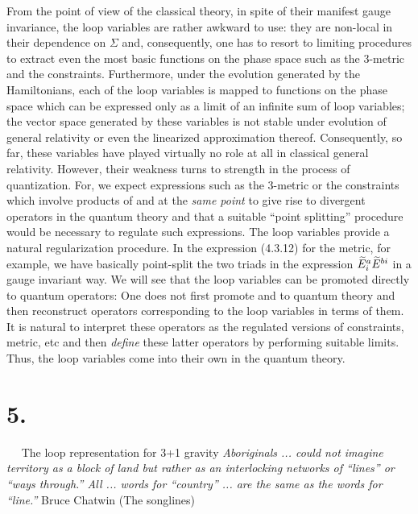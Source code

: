 {}From the point of view of the classical theory, in spite of their manifest
gauge invariance, the loop variables are rather awkward to use: they
are non-local in their dependence on $\Sigma$ and, consequently, one has
to resort to limiting procedures to extract even the most basic functions
on the phase space such as the 3-metric and the constraints. Furthermore,
under the evolution generated by the Hamiltonians, each of the loop
variables is mapped to functions on the phase space which can be
expressed only as a limit of an infinite sum of loop variables; the
vector space generated by these variables is not stable under evolution
of general relativity or even the linearized approximation thereof.
Consequently, so far, these variables have played virtually no role at all
in classical general relativity. However, their weakness turns to strength
in the process of quantization. For, we expect expressions such as the
3-metric or the constraints which involve products of \A\- and \E\- at the
{\it same point} to give rise to divergent operators in the quantum theory
and that a suitable ``point splitting'' procedure would be necessary to
regulate such expressions. The loop variables provide a natural
regularization procedure. In the expression (4.3.12) for the metric, for
example, we have basically point-split the two triads in the expression
$\widetilde{E}^a_i\widetilde{E}^{bi}$ in a gauge invariant way. We will see that the
loop variables can be promoted directly to quantum operators: One
does not first promote \A\- and \E\- to quantum theory and then reconstruct
operators corresponding to the loop variables in terms of them. It is
natural to interpret these operators as the regulated versions of
constraints, metric, etc and then {\it define} these latter operators
by performing suitable limits. Thus, the loop variables come into their
own in the quantum theory.

\goodbreak
\vfill\break

%
\section{5.}{${}\quad $ The loop representation for 3+1 gravity}%
\medskip
{\narrower\narrower\smallskip\noindent
{\sl Aboriginals ... could not imagine territory as a block of land
but rather as an interlocking networks of ``lines'' or ``ways through.'' All
... words for ``country'' ... are the same as the words for ``line.'' }
\smallskip
Bruce Chatwin (The songlines)\smallskip}

